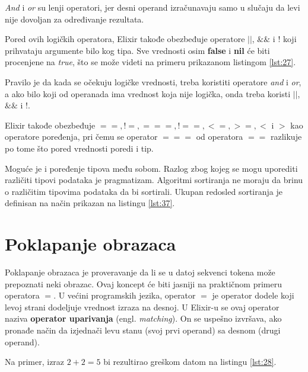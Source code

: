 \documentclass[12pt,oneside]{memoir}
\begin{document}


\noindent \textit{And} i \textit{or} su lenji operatori, jer desni operand izračunavaju samo u slučaju da levi nije dovoljan za određivanje rezultata.

Pored ovih logičkih operatora, Elixir takođe obezbeđuje operatore $||$, $\&\&$ i $!$ koji prihvataju argumente bilo kog tipa. Sve vrednosti osim \textbf{false} i \textbf{nil} će biti procenjene na \textit{true}, što se može videti na primeru prikazanom listingom \ref{lst:27}.





Pravilo je da kada se očekuju logičke vrednosti, treba koristiti operatore \textit{and} i \textit{or}, a ako bilo koji od operanada ima vrednost koja nije logička, onda treba koristi $||$, $\&\&$ i $!$.

Elixir takođe obezbeđuje $==,! =, ===,! ==, <=,> =, <$ i $ >$ kao operatore poređenja, pri čemu se operator $===$ od operatora $==$ razlikuje po tome što pored vrednosti poredi i tip.

Moguće je i poređenje tipova među sobom. Razlog zbog kojeg se mogu uporediti različiti tipovi podataka je pragmatizam. Algoritmi sortiranja ne moraju da brinu o različitim tipovima podataka da bi sortirali. Ukupan redosled sortiranja je definisan na način prikazan na listingu \ref{lst:37}.



\section{Poklapanje obrazaca}

Poklapanje obrazaca je proveravanje da li se u datoj sekvenci tokena može prepoznati neki obrazac. Ovaj koncept će biti jasniji na praktičnom primeru operatora $=$. U većini programskih jezika, operator $=$ je operator dodele koji levoj strani dodeljuje vrednost izraza na desnoj. U Elixir-u se ovaj operator naziva \textbf{operator uparivanja} (engl. \textit{matching}). On se uspešno izvršava, ako pronađe način da izjednači levu stanu (svoj prvi operand) sa desnom (drugi operand).

Na primer, izraz $2 + 2 = 5$ bi rezultirao greškom datom na listingu \ref{lst:28}.
\end{document}
